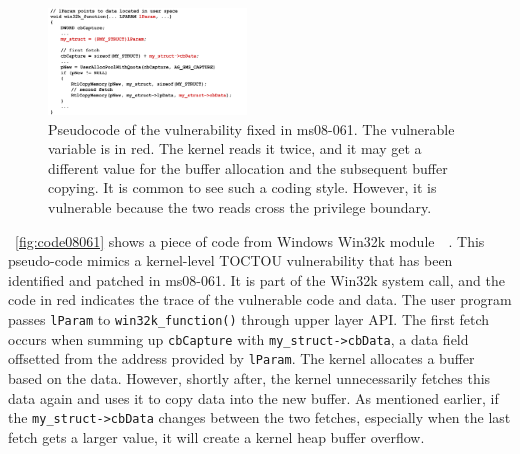 %
%


\begin{figure}[th]
	\includegraphics[width=0.47\textwidth]{figures/code08061}
	\centering
	\caption{Pseudocode of the vulnerability fixed in ms08-061. The vulnerable variable is in red. The kernel reads it twice, and it may get a different value for the buffer allocation and the subsequent buffer copying. It is common to see such a coding style. However, it is vulnerable because the two reads cross the privilege boundary.}
	\label{fig:code08061}
\end{figure}



~\autoref{fig:code08061} shows a piece of code from Windows Win32k module~\cite{jurczyk2013identifying}~\cite{ms08061}. This pseudo-code mimics a kernel-level TOCTOU vulnerability that has been identified and patched in ms08-061. It is part of the Win32k system call, and the code in red indicates the trace of the vulnerable code and data.  The user program passes \texttt{lParam} to \texttt{win32k\_function()} through upper layer API.  The first fetch occurs when summing up \texttt{cbCapture} with \texttt{my\_struct->cbData}, a data field offsetted from the address provided by \texttt{lParam}. The kernel allocates a buffer based on the data. However, shortly after, the kernel unnecessarily fetches this data again and uses it to copy data into the new buffer. As mentioned earlier, if the  \texttt{my\_struct->cbData} changes between the two fetches, especially when the last fetch gets a larger value, it will create a kernel heap buffer overflow. 


